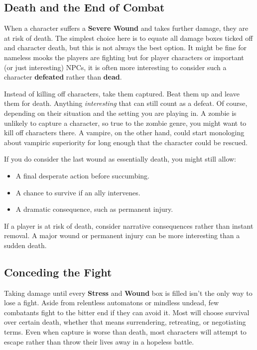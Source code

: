 \subsection{Death and the End of Combat}\label{core:death}
When a character suffers a \textbf{Severe Wound} and takes further damage, they are at risk of death. The simplest choice here is to equate all damage boxes ticked off and character death, but this is not always the best option. It might be fine for nameless mooks the players are fighting but for player characters or important (or just interesting) NPCs, it is often more interesting to consider such a character \textbf{defeated} rather than \textbf{dead}.

Instead of killing off characters, take them captured. Beat them up and leave them for death. Anything \emph{interesting} that can still count as a defeat. Of course, depending on their situation and the setting you are playing in. A zombie is unlikely to capture a character, so true to the zombie genre, you might want to kill off characters there. A vampire, on the other hand, could start monologing about vampiric superiority for long enough that the character could be rescued. 

If you do consider the last wound as essentially death, you might still allow:
\begin{itemize}
    \item A final desperate action before succumbing.
    \item A chance to survive if an ally intervenes.
    \item A dramatic consequence, such as permanent injury.
\end{itemize}

\begin{WyrdGmTips}
	If a player is at risk of death, consider narrative consequences rather than instant removal. A major wound or permanent injury can be more interesting than a sudden death.
\end{WyrdGmTips}


\subsection{Conceding the Fight}\label{core:conceding}

Taking damage until every \textbf{Stress} and \textbf{Wound} box is filled isn’t the only way to lose a fight. Aside from relentless automatons or mindless undead, few combatants fight to the bitter end if they can avoid it. Most will choose survival over certain death, whether that means surrendering, retreating, or negotiating terms. Even when capture is worse than death, most characters will attempt to escape rather than throw their lives away in a hopeless battle.

